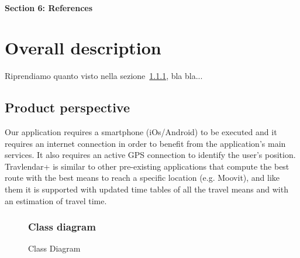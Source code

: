 \documentclass[12pt,titlepage]{article}
\begin{document}
\paragraph{Section 6: References}
\pagebreak

\section{Overall description}\label{sec:crit}

Riprendiamo quanto visto nella sezione~\ref{sec:mod1}, bla bla...
\subsection{Product perspective}\label{sec:mod1}
Our application requires a smartphone (iOs/Android) to be executed and it requires an internet connection in order to benefit from the application's main services.
It also requires an active GPS connection to identify the user's position. 
Travlendar+ is similar to other pre-existing applications that compute the best route with the best means to reach a specific location (e.g. Moovit), and like them it is supported with updated time tables of all the travel means and with an estimation of travel time. 

\begin{figure}
\subsubsection{Class diagram}\label{sec:mod1}
\centering
{}
\caption{Class Diagram}
\end{figure}
\end{document}
